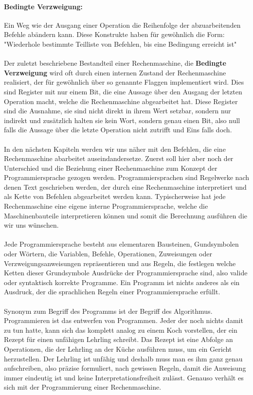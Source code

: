\documentclass[11pt,a4paper,leqno]{report}
\numberwithin{equation}{chapter}
\begin{document}
\paragraph{Bedingte Verzweigung:} Ein Weg wie der Ausgang einer Operation die Reihenfolge der abzuarbeitenden Befehle abändern kann. Diese Konstrukte haben für gewöhnlich die Form: "Wiederhole bestimmte Teilliste von Befehlen, bis eine Bedingung erreicht ist"
\\
\\
Der zuletzt beschriebene Bestandteil einer Rechenmaschine, die \textbf{Bedingte Verzweigung} wird oft durch einen internen Zustand der Rechenmaschine realisiert, der für gewöhnlich über so genannte Flaggen implementiert wird. Dies sind Register mit nur einem Bit, die eine Aussage über den Ausgang der letzten Operation macht, welche die Rechenmaschine abgearbeitet hat. Diese Register sind die Ausnahme, sie sind nicht direkt in ihrem Wert setzbar, sondern nur indirekt und zusätzlich halten sie kein Wort, sondern genau einen Bit, also null falls die Aussage über die letzte Operation nicht zutrifft und Eins falls doch.\\
\\
In den nächsten Kapiteln werden wir uns näher mit den Befehlen, die eine Rechenmaschine abarbeitet auseindandersetze. Zuerst soll hier aber noch der Unterschied und die Beziehung einer Rechenmaschine zum Konzept der Programmiersprache gezogen werden. Programmiersprachen sind Regelwerke nach denen  Text geschrieben werden, der durch eine Rechenmaschine interpretiert und als Kette von Befehlen abgearbeitet werden kann.
Typischerweise hat jede Rechenmaschine eine eigene interne Programmiersprache, welche die Maschinenbauteile interpretieren können und somit die Berechnung ausführen die wir uns wünschen.\\
\\
Jede Programmiersprache besteht aus elementaren Bausteinen, Gundsymbolen oder Wörtern, die Variablen, Befehle, Operationen, Zuweisungen oder\\ Verzweigungsanweisungen repräsentieren und aus Regeln, die festlegen welche Ketten dieser Grundsymbole Ausdrücke der Programmiersprache sind, also valide oder syntaktisch korrekte Programme. Ein Programm ist nichts anderes als ein Ausdruck, der die sprachlichen Regeln einer Programmiersprache erfüllt.\\
\\
Synonym zum Begriff des Programms ist der Begriff des Algorithmus. \\
Programmieren ist das entwerfen von Programmen. Jeder der noch nichts damit zu tun hatte, kann sich das komplett analog zu einem Koch vorstellen, der ein Rezept für einen unfähigen Lehrling schreibt. Das Rezept ist eine Abfolge an Operationen, die der Lehrling an der Küche ausführen muss, um ein Gericht herzustellen. Der Lehrling ist unfähig und deshalb muss man es ihm ganz genau aufschreiben, also präzise formuliert, nach gewissen Regeln, damit die Anweisung immer eindeutig ist und keine Interpretationsfreiheit zulässt. Genauso verhält es sich mit der Programmierung einer Rechenmaschine.
\newpage
\end{document}
